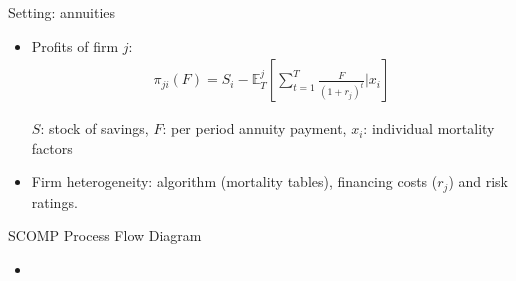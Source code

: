\documentclass[10pt,aspectratio=169]{beamer}
\begin{document}
\begin{frame}{Setting: annuities}\label{slide:setting}
    
    
    \begin{itemize}%
        \item Profits of firm $j$: 
    \begin{align*}
    \pi_{ji}(F) = S_i-  \mathbb{E}^j_{T} \left[\sum_{t=1}^T\frac{F}{(1+r_j)^t}|x_i \right]
    \end{align*}
   
     $S$: stock of savings, $F$: per period annuity payment, $x_i$: individual mortality factors
    
    \item Firm heterogeneity: algorithm (mortality tables), financing costs ($r_j$) and risk ratings. 
    \end{itemize}

\end{frame}


\begin{frame}{SCOMP Process Flow Diagram}\label{slide:setting2}
\begin{center}

\end{center}
\begin{itemize}
    \item \hyperlink{slide:fig5}{}
\end{itemize}
\end{frame}
\end{document}

